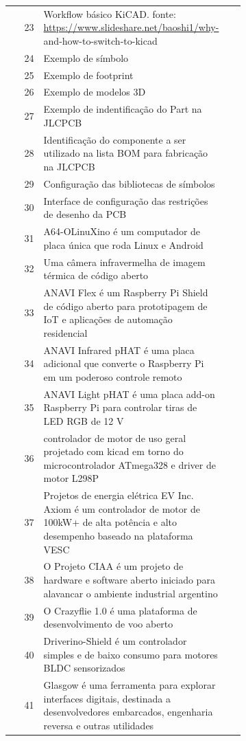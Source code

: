 \begin{longtable}{@{}r>{\raggedright\arraybackslash}p{0.68\linewidth}r@{}}
23 & Workflow básico KiCAD. fonte: \url{https://www.slideshare.net/baoshi1/why-} and-how-to-switch-to-kicad & \pageref{fig:23} \\
24 & Exemplo de símbolo & \pageref{fig:24} \\
25 & Exemplo de footprint & \pageref{fig:25} \\
26 & Exemplo de modelos 3D & \pageref{fig:26} \\
27 & Exemplo de indentificação do Part na JLCPCB & \pageref{fig:27} \\
28 & Identificação do componente a ser utilizado na lista BOM para fabricação na JLCPCB & \pageref{fig:28} \\
29 & Configuração das bibliotecas de símbolos & \pageref{fig:29} \\
30 & Interface de configuração das restrições de desenho da PCB & \pageref{fig:30} \\
31 & A64-OLinuXino é um computador de placa única que roda Linux e Android & \pageref{fig:31} \\
32 & Uma câmera infravermelha de imagem térmica de código aberto & \pageref{fig:32} \\
33 & ANAVI Flex é um Raspberry Pi Shield de código aberto para prototipagem de IoT e aplicações de automação residencial & \pageref{fig:33} \\
34 & ANAVI Infrared pHAT é uma placa adicional que converte o Raspberry Pi em um poderoso controle remoto & \pageref{fig:34} \\
35 & ANAVI Light pHAT é uma placa add-on Raspberry Pi para controlar tiras de LED RGB de 12 V & \pageref{fig:35} \\
36 & controlador de motor de uso geral projetado com kicad em torno do microcontrolador ATmega328 e driver de motor L298P & \pageref{fig:36} \\
37 & Projetos de energia elétrica EV Inc. Axiom é um controlador de motor de 100kW+ de alta potência e alto desempenho baseado na plataforma VESC & \pageref{fig:37} \\
38 & O Projeto CIAA é um projeto de hardware e software aberto iniciado para alavancar o ambiente industrial argentino & \pageref{fig:38} \\
39 & O Crazyflie 1.0 é uma plataforma de desenvolvimento de voo aberto & \pageref{fig:39} \\
40 & Driverino-Shield é um controlador simples e de baixo consumo para motores BLDC sensorizados & \pageref{fig:40} \\
41 & Glasgow é uma ferramenta para explorar interfaces digitais, destinada a desenvolvedores embarcados, engenharia reversa e outras utilidades & \pageref{fig:41} \\

\end{longtable}
